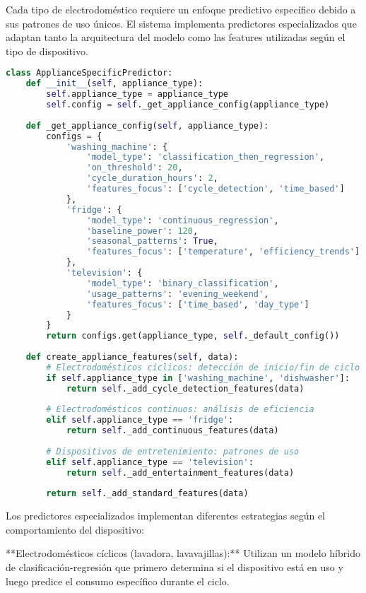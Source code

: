 Cada tipo de electrodoméstico requiere un enfoque predictivo específico debido a sus patrones de uso únicos. El sistema implementa predictores especializados que adaptan tanto la arquitectura del modelo como las features utilizadas según el tipo de dispositivo.

\begin{lstlisting}[language=Python, caption=Arquitectura de predictores especializados]
class ApplianceSpecificPredictor:
    def __init__(self, appliance_type):
        self.appliance_type = appliance_type
        self.config = self._get_appliance_config(appliance_type)
    
    def _get_appliance_config(self, appliance_type):
        configs = {
            'washing_machine': {
                'model_type': 'classification_then_regression',
                'on_threshold': 20,
                'cycle_duration_hours': 2,
                'features_focus': ['cycle_detection', 'time_based']
            },
            'fridge': {
                'model_type': 'continuous_regression',
                'baseline_power': 120,
                'seasonal_patterns': True,
                'features_focus': ['temperature', 'efficiency_trends']
            },
            'television': {
                'model_type': 'binary_classification',
                'usage_patterns': 'evening_weekend',
                'features_focus': ['time_based', 'day_type']
            }
        }
        return configs.get(appliance_type, self._default_config())
    
    def create_appliance_features(self, data):
        # Electrodomésticos cíclicos: detección de inicio/fin de ciclo
        if self.appliance_type in ['washing_machine', 'dishwasher']:
            return self._add_cycle_detection_features(data)
        
        # Electrodomésticos continuos: análisis de eficiencia
        elif self.appliance_type == 'fridge':
            return self._add_continuous_features(data)
        
        # Dispositivos de entretenimiento: patrones de uso
        elif self.appliance_type == 'television':
            return self._add_entertainment_features(data)
        
        return self._add_standard_features(data)
\end{lstlisting}

Los predictores especializados implementan diferentes estrategias según el comportamiento del dispositivo:

**Electrodomésticos cíclicos (lavadora, lavavajillas):** Utilizan un modelo híbrido de clasificación-regresión que primero determina si el dispositivo está en uso y luego predice el consumo específico durante el ciclo.

